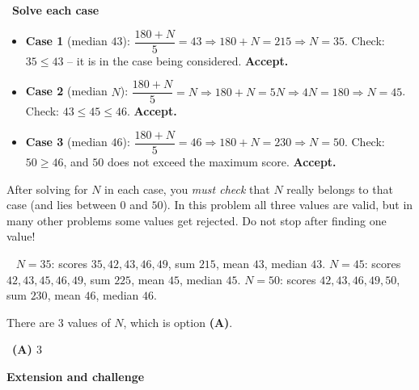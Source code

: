 \documentclass[11pt]{article}
\providecommand{\AnsWord}{Đáp số}
\newcommand{\ans}[1]{\par\smallskip{\bfseries\color{tmGreen!88!black}\AnsWord:}\ {\bfseries\color{AnsRed}#1}\par}
\newcommand{\dividerbar}[1]{\par\vspace{0.6em}\noindent
  \begin{tcolorbox}[enhanced,frame hidden,interior hidden,borderline west={5pt}{0pt}{ProbBlue},
    colback=white,left=12pt,right=12pt,top=5pt,bottom=5pt,arc=4pt]
  {\large\bfseries\color{ProbBlue} #1}\end{tcolorbox}\vspace{0.4em}}
\newcommand{\step}[2]{\par\smallskip\noindent{\bfseries\color{tmBlue!85!black}\StepWord~#1.}\ {\bfseries #2}\par\nopagebreak}
\newcommand{\verify}[1]{\par\smallskip\noindent{\bfseries\color{tmGreen!80!black}\faCheckCircle\ \CheckWord}\ #1\par}
\def\AnsWord{Answer}
\def\StepWord{Step}
\def\CheckWord{Check:}
\begin{document}
{\step{3}{Solve each case}
\begin{itemize}[leftmargin=1.4em,itemsep=1pt]
\item \textbf{Case 1} (median $43$): $\dfrac{180+N}{5}=43\Rightarrow 180+N=215\Rightarrow N=35$. Check: $35\le 43$ -- it is in the case being considered. \textbf{Accept.}
\item \textbf{Case 2} (median $N$): $\dfrac{180+N}{5}=N\Rightarrow 180+N=5N\Rightarrow 4N=180\Rightarrow N=45$. Check: $43\le 45\le 46$. \textbf{Accept.}
\item \textbf{Case 3} (median $46$): $\dfrac{180+N}{5}=46\Rightarrow 180+N=230\Rightarrow N=50$. Check: $50\ge 46$, and $50$ does not exceed the maximum score. \textbf{Accept.}
\end{itemize}

\begin{warnbox}After solving for $N$ in each case, you \emph{must check} that $N$ really belongs to that case (and lies between $0$ and $50$). In this problem all three values are valid, but in many other problems some values get rejected. Do not stop after finding one value!\end{warnbox}

\verify{
$N=35$: scores $35,42,43,46,49$, sum $215$, mean $43$, median $43$.
$N=45$: scores $42,43,45,46,49$, sum $225$, mean $45$, median $45$.
$N=50$: scores $42,43,46,49,50$, sum $230$, mean $46$, median $46$.}
There are $3$ values of $N$, which is option \textbf{(A)}.
\ans{(A) $3$}
}

\clearpage
\dividerbar{Extension and challenge}
\end{document}
